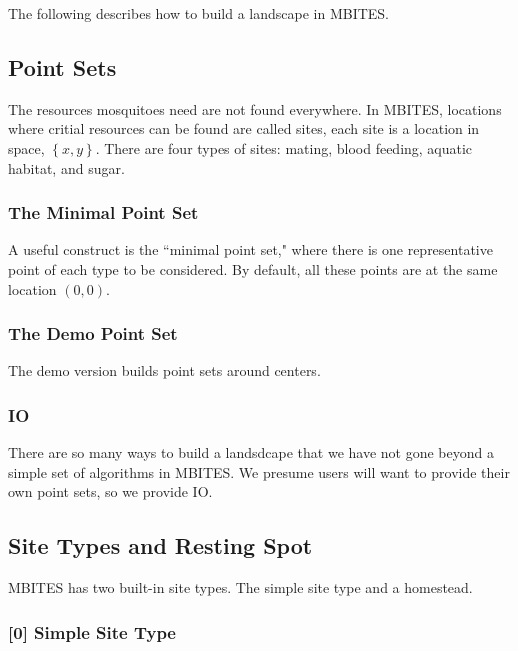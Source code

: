 \documentclass{article}
\begin{document}
The following describes how to build a landscape in MBITES. 

\subsection{Point Sets}

The resources mosquitoes need are not found everywhere.  In MBITES, locations where critial resources can be found are called sites, each site is a location in space, $\left\{ x,y \right\}$. There are four types of sites: mating, blood feeding, aquatic habitat, and sugar.

\subsubsection{The Minimal Point Set}

A useful construct is the ``minimal point set," where there is one representative point of each type to be considered. By default, all these points are at the same location $(0,0)$. 

\subsubsection{The Demo Point Set}

The demo version builds point sets around centers. 

\subsubsection{IO}

There are so many ways to build a landsdcape that we have not gone beyond a simple set of algorithms in MBITES. We presume users will want to provide their own point sets, so we provide IO. 

\subsubsection{}


\subsection{Site Types and Resting Spot}

MBITES has two built-in site types. The simple site type and a homestead. 

\subsubsection*{[0] Simple Site Type}
\end{document}

